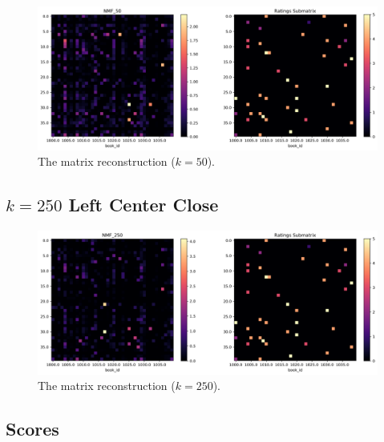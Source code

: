\documentclass[handout]{beamer}
\begin{document}
\begin{frame}
 \begin{figure}[t]
    \includegraphics[width=\linewidth]{../image/goodreads-models/nmf-50-left-center-close.png}
    \caption[NMF-50-left-center-close]{The matrix reconstruction ($k=50$).}
     \label{fig:nmf-50-left-center-close}
\end{figure}
\end{frame}

\subsection{$k=250$ Left Center Close}\label{k-250-left-center-close}

\begin{frame}
 \begin{figure}[t]
    \includegraphics[width=\linewidth]{../image/goodreads-models/nmf-250-left-center-close.png}
    \caption[NMF-250-left-center-close]{The matrix reconstruction ($k=250$).}
     \label{fig:nmf-250-left-center-close}
\end{figure}
\end{frame}

\subsection{Scores}\label{scores}
\end{document}
